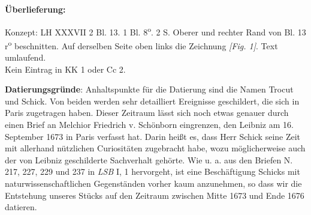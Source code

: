       
               
                \begin{ledgroupsized}[r]{120mm}
                \footnotesize 
                \pstart                
                \noindent\textbf{\"{U}berlieferung:}   
                \pend
                \end{ledgroupsized}
            
              
                            \begin{ledgroupsized}[r]{114mm}
                            \footnotesize 
                            \pstart \parindent -6mm
                            Konzept: LH XXXVII 2 Bl. 13. 1 Bl. 8\textsuperscript{o}. 2 S. Oberer und rechter Rand von Bl. 13 r\textsuperscript{o} beschnitten. Auf derselben Seite oben links die Zeichnung \textit{[Fig. 1]}. Text umlaufend.\\Kein Eintrag in KK 1 oder Cc 2. \pend
                            \end{ledgroupsized}
                \vspace*{5mm}
                \begin{ledgroup}
                \footnotesize 
                \pstart
            \noindent\footnotesize{\textbf{Datierungsgr\"{u}nde}: Anhaltspunkte f\"{u}r die Datierung sind die Namen Trocut\protect{} und Schick\protect{}. Von beiden werden sehr detailliert Ereignisse geschildert, die sich in Paris\protect{} zugetragen haben. Dieser Zeitraum l\"{a}sst sich noch etwas genauer durch einen Brief an Melchior Friedrich v. Sch\"{o}nborn\protect{} eingrenzen, den Leibniz am 16. September 1673 in Paris\protect{} verfasst hat. Darin heißt es, dass Herr Schick\protect{} seine Zeit mit allerhand n\"{u}tzlichen Curiosit\"{a}ten zugebracht habe, wozu m\"{o}glicherweise auch der von Leibniz geschilderte Sachverhalt geh\"{o}rte. Wie u. a. aus den Briefen N. 217, 227, 229 und 237 in \textit{LSB} I, 1 hervorgeht, ist eine Besch\"{a}ftigung Schicks\protect{} mit naturwissenschaftlichen Gegenst\"{a}nden vorher kaum anzunehmen, so dass wir die Entstehung unseres St\"{u}cks auf den Zeitraum zwischen Mitte 1673 und Ende 1676 datieren.}
                \pend
                \end{ledgroup}
            
